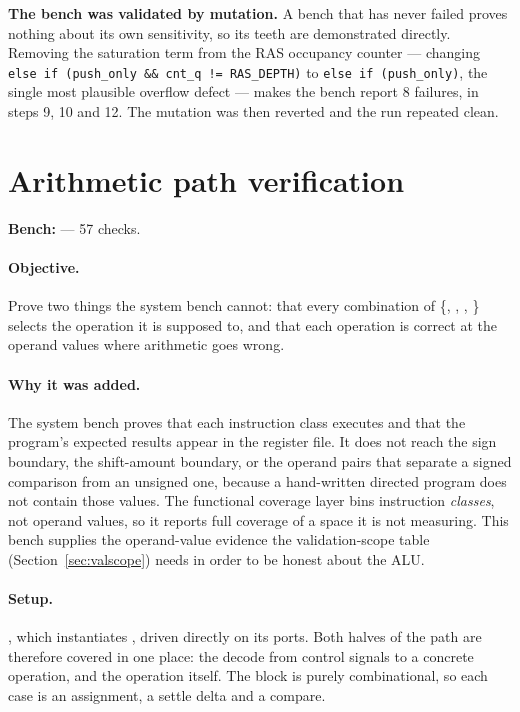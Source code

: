 \begin{rtlnote}
\textbf{The bench was validated by mutation.} A bench that has never failed
proves nothing about its own sensitivity, so its teeth are demonstrated
directly. Removing the saturation term from the RAS
occupancy counter --- changing \texttt{else if (push\_only \&\& cnt\_q !=
RAS\_DEPTH)} to \texttt{else if (push\_only)}, the single most plausible
overflow defect --- makes the bench report 8 failures, in steps 9, 10 and 12.
The mutation was then reverted and the run repeated clean.
\end{rtlnote}

\section{Arithmetic path verification}
\label{sec:vp-alu}

\textbf{Bench:}  --- 57 checks.

\paragraph{Objective.} Prove two things the system bench cannot: that every
combination of \{, , , \} selects
the operation it is supposed to, and that each operation is correct at the
operand values where arithmetic goes wrong.

\paragraph{Why it was added.} The system bench proves that each instruction
class executes and that the program's expected results appear in the register
file. It does not reach the sign boundary, the shift-amount boundary, or the
operand pairs that separate a signed comparison from an unsigned one, because a
hand-written directed program does not contain those values. The functional
coverage layer bins instruction \emph{classes}, not operand values, so it
reports full coverage of a space it is not measuring. This bench supplies the
operand-value evidence the validation-scope table
(Section~\ref{sec:valscope}) needs in order to be honest about the ALU.

\paragraph{Setup.} , which instantiates , driven
directly on its ports. Both halves of the path are therefore covered in one
place: the decode from control signals to a concrete operation, and the
operation itself. The block is purely combinational, so each case is an
assignment, a settle delta and a compare.

